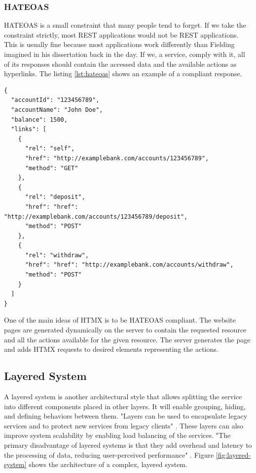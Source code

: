 \subsubsection{HATEOAS}

HATEOAS is a small constraint that many people tend to forget. If we take the constraint strictly, most REST applications would not be REST applications. This is usually fine because most applications work differently than Fielding imagined in his dissertation back in the day. If we, a service, comply with it, all of its responses should contain the accessed data and the available actions as hyperlinks. The listing \ref{lst:hateoas} shows an example of a compliant response.

\begin{lstlisting}[caption=An HATEOAS response in JSON format,label=lst:hateoas, float]
{
  "accountId": "123456789",
  "accountName": "John Doe",
  "balance": 1500,
  "links": [
    {
      "rel": "self",
      "href": "http://examplebank.com/accounts/123456789",
      "method": "GET"
    },
    {
      "rel": "deposit",
      "href": "href": "http://examplebank.com/accounts/123456789/deposit",
      "method": "POST"
    },
    {
      "rel": "withdraw",
      "href": "href": "http://examplebank.com/accounts/withdraw",
      "method": "POST"
    }
  ]
}
\end{lstlisting}

One of the main ideas of HTMX is to be HATEOAS compliant. The website pages are generated dynamically on the server to contain the requested resource and all the actions available for the given resource. The server generates the page and adds HTMX requests to desired elements representing the actions.

\subsection{Layered System}

A layered system is another architectural style that allows splitting the service into different components placed in other layers. It will enable grouping, hiding, and defining behaviors between them. "Layers can be used to encapsulate legacy services and to protect new services from legacy clients" \cite{fielding2000}. These layers can also improve system scalability by enabling load balancing of the services. "The primary disadvantage of layered systems is that they add overhead and latency to the processing of data, reducing user-perceived performance" \cite{Clark1990ArchitecturalCF}. Figure \ref{fig:layered-system} shows the architecture of a complex, layered system.

